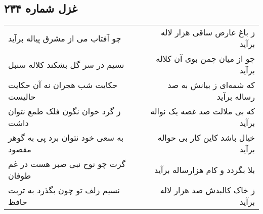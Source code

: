 \begin{center}
\section*{غزل شماره ۲۳۴}
\label{sec:sh234}
\begin{longtable}{l p{0.5cm} r}
چو آفتاب می از مشرق پیاله برآید
&&
ز باغ عارض ساقی هزار لاله برآید
\\
نسیم در سر گل بشکند کلاله سنبل
&&
چو از میان چمن بوی آن کلاله برآید
\\
حکایت شب هجران نه آن حکایت حالیست
&&
که شمه‌ای ز بیانش به صد رساله برآید
\\
ز گرد خوان نگون فلک طمع نتوان داشت
&&
که بی ملالت صد غصه یک نواله برآید
\\
به سعی خود نتوان برد پی به گوهر مقصود
&&
خیال باشد کاین کار بی حواله برآید
\\
گرت چو نوح نبی صبر هست در غم طوفان
&&
بلا بگردد و کام هزارساله برآید
\\
نسیم زلف تو چون بگذرد به تربت حافظ
&&
ز خاک کالبدش صد هزار لاله برآید
\\
\end{longtable}
\end{center}
